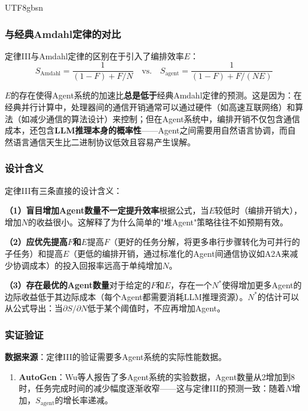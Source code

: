 \documentclass[11pt,a4paper]{article}
\begin{document}
\begin{CJK*}{UTF8}{gbsn}
\subsubsection{与经典Amdahl定律的对比}

定律III与Amdahl定律的区别在于引入了编排效率$E$：
\begin{equation}
S_{\mathrm{Amdahl}} = \frac{1}{(1-F) + F/N} \quad \text{vs.} \quad S_{\mathrm{agent}} = \frac{1}{(1-F) + F/(NE)}
\end{equation}

$E$的存在使得Agent系统的加速比\textbf{总是低于}经典Amdahl定律的预测。这是因为：在经典并行计算中，处理器间的通信开销通常可以通过硬件（如高速互联网络）和算法（如减少通信的算法设计）来控制；但在Agent系统中，编排开销不仅包含通信成本，还包含\textbf{LLM推理本身的概率性}——Agent之间需要用自然语言协调，而自然语言通信天生比二进制协议低效且容易产生误解。

\subsubsection{设计含义}

定律III有三条直接的设计含义：

\textbf{（1）盲目增加Agent数量不一定提升效率}根据公式，当$E$较低时（编排开销大），增加$N$的收益很小。这解释了为什么简单的"堆Agent"策略往往不如预期有效。

\textbf{（2）应优先提高$F$和$E$}提高$F$（更好的任务分解，将更多串行步骤转化为可并行的子任务）和提高$E$（更低的编排开销，通过标准化的Agent间通信协议如A2A\cite{agentprotocols2025}来减少协调成本）的投入回报率远高于单纯增加$N$。

\textbf{（3）存在最优的Agent数量}对于给定的$F$和$E$，存在一个$N^*$使得增加更多Agent的边际收益低于其边际成本（每个Agent都需要消耗LLM推理资源）。$N^*$的估计可以从公式导出：当$\partial S / \partial N$低于某个阈值时，不应再增加Agent。

\subsubsection{实证验证}

\textbf{数据来源}：定律III的验证需要多Agent系统的实际性能数据。

\begin{enumerate}[nosep]
\item \textbf{AutoGen}：Wu等人报告了多Agent系统的实验数据，Agent数量从2增加到8时，任务完成时间的减少幅度逐渐收窄\cite{wu2023autogen}——这与定律III的预测一致：随着$N$增加，$S_{\mathrm{agent}}$的增长率递减。


\end{enumerate}
\end{CJK*}
\end{document}

